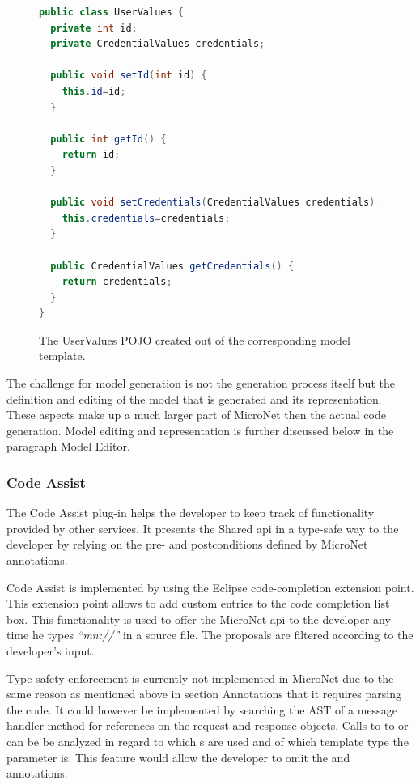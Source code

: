 \begin{figure}
\begin{lstlisting}[language=Java,firstnumber=1] 
public class UserValues {
  private int id;
  private CredentialValues credentials;

  public void setId(int id) {
    this.id=id;
  }

  public int getId() {
    return id;
  }

  public void setCredentials(CredentialValues credentials) {
    this.credentials=credentials;
  }

  public CredentialValues getCredentials() {
    return credentials;
  }
}
\end{lstlisting}
\caption{The UserValues POJO created out of the corresponding model template.}
\label{lst:generated_model_class}
\end{figure}

The challenge for model generation is not the generation process itself but the
definition and editing of the model that is generated and its representation.
These aspects make up a much larger part of MicroNet then the actual code
generation. Model editing and representation is further discussed below in the
paragraph Model Editor.

\subsubsection{Code Assist}

The Code Assist plug-in helps the developer to keep track of functionality
provided by other services. It presents the Shared \gls{api} in a type-safe way to
the developer by relying on the pre- and postconditions defined by MicroNet
annotations.

Code Assist is implemented by using the Eclipse code-completion extension point.
This extension point allows to add custom entries to the code completion list
box. This functionality is used to offer the MicroNet \gls{api} to the developer any
time he types \textit{``mn://''} in a source file. The proposals are filtered
according to the developer's input.

Type-safety enforcement is currently not implemented in MicroNet due to the same
reason as mentioned above in section Annotations that it requires parsing the
\ms{} code. It could however be implemented by searching the AST of a message
handler method for references on the request and response objects. Calls to to
 or  can be be analyzed in regard to
which s are used and of which template type the parameter
is. This feature would allow the developer to omit the
 and  annotations.

